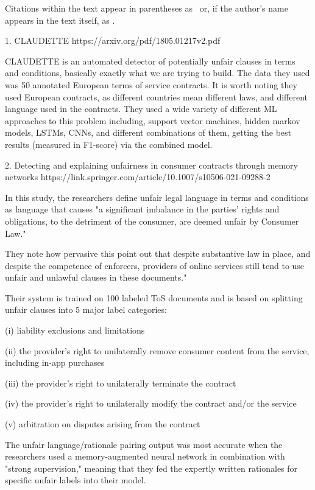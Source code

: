 \documentclass[11pt,a4paper]{article}
\begin{document}
Citations within the text appear in parentheses as~\citep{aho1972theory} or, if the author's name appears in the text itself, as \citet{andrew2007scalable}.

1. CLAUDETTE
https://arxiv.org/pdf/1805.01217v2.pdf

CLAUDETTE is an automated detector of potentially unfair clauses in terms and conditions, basically exactly what we are trying to build. The data they used was 50 annotated European terms of service contracts. It is worth noting they used European contracts, as different countries mean different laws, and different language used in the contracts. They used a wide variety of different ML approaches to this problem including, support vector machines, hidden markov models, LSTMs, CNNs, and different combinations of them, getting the best results (measured in F1-score) via the combined model.  

2. Detecting and explaining unfairness in consumer contracts through memory networks
https://link.springer.com/article/10.1007/s10506-021-09288-2

In this study, the researchers define unfair legal language in terms and conditions as language that causes "a significant imbalance in the parties' rights and obligations, to the detriment of the consumer, are deemed unfair by Consumer Law."

They note how pervasive this point out that despite substantive law in place, and despite the competence of enforcers, providers of online services still tend to use unfair and unlawful clauses in these documents."

Their system is trained on 100 labeled ToS documents and is based on splitting unfair clauses into 5 major label categories:

(i) liability exclusions and limitations

(ii) the provider’s right to unilaterally remove consumer content from the service, including in-app purchases

(iii) the provider’s right to unilaterally terminate the contract

(iv) the provider’s right to unilaterally modify the contract and/or the service

(v) arbitration on disputes arising from the contract

The unfair language/rationale pairing output was most accurate when the researchers used a memory-augmented neural network in combination with "strong supervision," meaning that they fed the expertly written rationales for specific unfair labels into their model.
\end{document}
